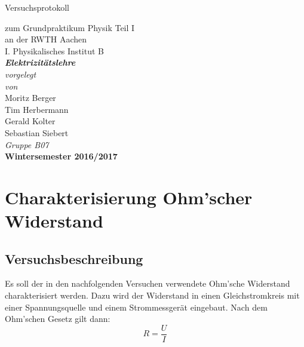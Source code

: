 \documentclass[12pt,a4paper]{article}
\author{Tim}
\begin{document}
\setlength{\parindent}{0pt} 
\begin{center}
{\LARGE Versuchsprotokoll}\\
\begin{large}
zum Grundpraktikum Physik Teil I\\[0.4cm]
an der RWTH Aachen\\
I. Physikalisches Institut B\\[4.5cm]
\Large\textbf{\textsl{Elektrizitätslehre}}\\[4cm]
\normalsize\textit{vorgelegt\\von}\\[0.4cm]
\large{Moritz Berger\\Tim Herbermann\\Gerald Kolter\\Sebastian Siebert}\\[1cm]
\large \textit{Gruppe B07} \\ [3cm]
\large \textbf{Wintersemester 2016/2017}
\end{large}
\end{center}
\newpage

\tableofcontents
\newpage

\section{Charakterisierung Ohm'scher Widerstand}
\subsection{Versuchsbeschreibung}
Es soll der in den nachfolgenden Versuchen verwendete Ohm'sche Widerstand charakterisiert werden. Dazu wird der Widerstand in einen Gleichstromkreis mit einer Spannungsquelle und einem Strommessgerät eingebaut. Nach dem Ohm'schen Gesetz gilt dann:
\begin{equation}
R = \dfrac{U}{I}
\label{eq:Ohm}
\end{equation}
\end{document}
